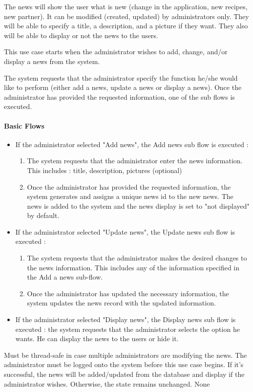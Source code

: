 {
  The news will show the user what is new (change in the application, new recipes, new partner). It can be modified (created, updated) by administrators only. They will be able to specify a title, a description, and a picture if they want. They also will be able to display or not the news to the users.

}
{
  This use case starts when the administrator wishes to add, change, and/or display a news from the system.

  The system requests that the administrator specify the function he/she would like to perform (either add a news, update a news or display a news). Once the administrator has provided the requested information, one of the sub flows is executed.

  \paragraph{Basic Flows}
  \begin{itemize}
    \item If the administrator selected "Add news", the Add news sub flow is executed :
    \begin{enumerate}
      \item The system requests that the administrator enter the news information. This includes : title, description, pictures (optional)
      \item Once the administrator has provided the requested information, the system generates and assigns a unique news id to the new news. The news is added to the system and the news display is set to "not displayed" by default.
    \end{enumerate}
    \item If the administrator selected "Update news", the Update news sub flow is executed :
    \begin{enumerate}
      \item The system requests that the administrator makes the desired changes to the news information. This includes any of the information specified in the Add a news sub-flow.
      \item Once the administrator has updated the necessary information, the system updates the news record with the updated information.
    \end{enumerate}
    \item If the administrator selected "Display news", the Display news sub flow is executed : the system requests that the administrator selects the option he wants. He can display the news to the users or hide it.
    
  \end{itemize}

}
{Must be thread-safe in case multiple administrators are modifying the news.}
{The administrator must be logged onto the system before this use case begins.}
{If it’s successful, the news will be added/updated from the database and display if the administrator wishes. Otherwise, the state remains unchanged.}
{None}


